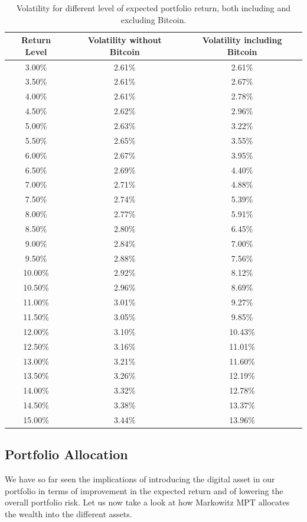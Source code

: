 \begin{table}
	\small
	\centering
	\caption[Markowitz efficient frontier on returns]{Volatility for different level of expected portfolio return, both including and excluding Bitcoin.}
	\label{tab:markowitz_vol_on_ret}
\begin{tabular}{ccc}
	Return Level & Volatility without Bitcoin & Volatility including Bitcoin\\
	\midrule
	3.00\% & 2.61\% & 2.61\% \\
	3.50\% & 2.61\% & 2.67\% \\
	4.00\% & 2.61\% & 2.78\% \\
	4.50\% & 2.62\% & 2.96\% \\
	5.00\% & 2.63\% & 3.22\% \\
	5.50\% & 2.65\% & 3.55\% \\
	6.00\% & 2.67\% & 3.95\% \\
	6.50\% & 2.69\% & 4.40\% \\
	7.00\% & 2.71\% & 4.88\% \\
	7.50\% & 2.74\% & 5.39\% \\
	8.00\% & 2.77\% & 5.91\% \\
	8.50\% & 2.80\% & 6.45\% \\
	9.00\% & 2.84\% & 7.00\% \\
	9.50\% & 2.88\% & 7.56\% \\
	10.00\% & 2.92\% & 8.12\% \\
	10.50\% & 2.96\% & 8.69\% \\
	11.00\% & 3.01\% & 9.27\% \\
	11.50\% & 3.05\% & 9.85\% \\
	12.00\% & 3.10\% & 10.43\% \\
	12.50\% & 3.16\% & 11.01\% \\
	13.00\% & 3.21\% & 11.60\% \\
	13.50\% & 3.26\% & 12.19\% \\
	14.00\% & 3.32\% & 12.78\% \\
	14.50\% & 3.38\% & 13.37\% \\
	15.00\% & 3.44\% & 13.96\% \\
	\midrule
\end{tabular}

\end{table}





\subsection{Portfolio Allocation}
We have so far seen the implications of introducing the digital asset in our portfolio in terms of improvement in the expected return and of lowering the overall portfolio risk.
Let us now take a look at how Markowitz MPT allocates the wealth into the different assets.

